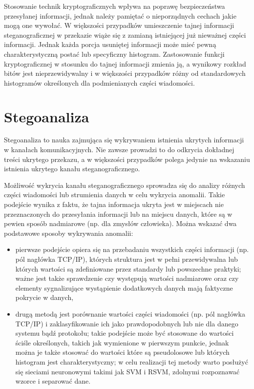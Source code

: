 \documentclass[a4paper,12pt,twoside,openany]{report}
\begin{document}
Stosowanie technik kryptograficznych wpływa na poprawę bezpieczeństwa przesyłanej informacji, jednak należy pamiętać o nieporządnych cechach jakie mogą one wywołać. W większości przypadków umieszczenie tajnej informacji steganograficznej w przekazie wiąże się z zamianą istniejącej już nieważnej części informacji. Jednak każda porcja usuniętej informacji może mieć pewną charakterystyczną postać lub specyficzny histogram. Zastosowanie funkcji kryptograficznej w stosunku do tajnej informacji zmienia ją, a wynikowy rozkład bitów jest nieprzewidywalny i w większości przypadków różny od standardowych histogramów określonych dla podmienianych części wiadomości.
\section{Stegoanaliza}
Stegoanaliza to nauka zajmująca się wykrywaniem istnienia ukrytych informacji w kanałach komunikacyjnych. Nie zawsze prowadzi to do odkrycia dokładnej treści ukrytego przekazu, a w większości przypadków polega jedynie na wskazaniu istnienia ukrytego kanału steganograficznego.

Możliwość wykrycia kanału steganograficznego sprowadza się do analizy różnych części wiadomości lub strumienia danych w celu wykrycia anomalii. Takie podejście wynika z faktu, że tajna informacja ukryta jest w miejscach nie przeznaczonych do przesyłania informacji lub na miejscu danych, które są w pewien sposób nadmiarowe (np. dla zmysłów człowieka). Można wskazać dwa podstawowe sposoby wykrywania anomalii:
\begin{itemize}
	\item pierwsze podejście opiera się na przebadaniu wszystkich części informacji (np. pól nagłówka TCP/IP), których struktura jest w pełni przewidywalna lub których wartości są zdefiniowane przez standardy lub powszechne praktyki; ważne jest także sprawdzenie czy występują wartości nadmiarowe oraz czy elementy sygnalizujące wystąpienie dodatkowych danych mają faktyczne pokrycie w danych,
	\item drugą metodą jest porównanie wartości części wiadomości (np. pól nagłówka TCP/IP) i zaklasyfikowanie ich jako prawdopodobnych lub nie dla danego systemu bądź protokołu; takie podejście może być stosowane do wartości ściśle określonych, takich jak wymienione w pierwszym punkcie, jednak można je także stosować do wartości które są pseudolosowe lub których histogram jest charakterystyczny; w celu realizacji tej metody warto posłużyć się sieciami neuronowymi takimi jak SVM i RSVM, zdolnymi rozpoznawać wzorce i separować dane.
\end{itemize}
\end{document}
